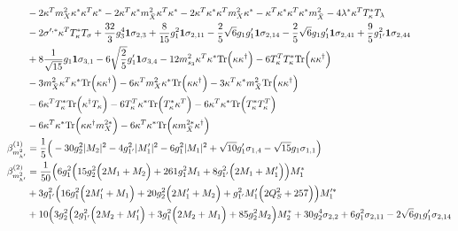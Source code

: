 {\begin{align}
 &-2 {\kappa^{T}  m_{X}^2  \kappa^*  \kappa^{T}  \kappa^*} -2 {\kappa^{T}  \kappa^*  m_{\bar{X}}^2  \kappa^{T}  \kappa^*} -2 {\kappa^{T}  \kappa^*  \kappa^{T}  m_{X}^2  \kappa^*} - {\kappa^{T}  \kappa^*  \kappa^{T}  \kappa^*  m_{\bar{X}}^2} -4 \lambda^* {\kappa^{T}  T_{\kappa}^*} T_{\lambda} \nonumber \\ 
 &-2 \sigma^{\prime,*} {\kappa^{T}  T_{\kappa}^*} T_{\sigma} +\frac{32}{3} g_{3}^{4} {\bf 1} \sigma_{2,3} +\frac{8}{15} g_{1}^{2} {\bf 1} \sigma_{2,11} -\frac{2}{5} \sqrt{6} g_1 g_1' {\bf 1} \sigma_{2,14} -\frac{2}{5} \sqrt{6} g_1 g_1' {\bf 1} \sigma_{2,41} +\frac{9}{5} g_{1'}^{2} {\bf 1} \sigma_{2,44} \nonumber \\ 
 &+8 \frac{1}{\sqrt{15}} g_1 {\bf 1} \sigma_{3,1} -6 \sqrt{\frac{2}{5}} g_1' {\bf 1} \sigma_{3,4} -12 m_{s_3}^2 {\kappa^{T}  \kappa^*} \mbox{Tr}\Big({\kappa  \kappa^{\dagger}}\Big) -6 {T_{\kappa}^{T}  T_{\kappa}^*} \mbox{Tr}\Big({\kappa  \kappa^{\dagger}}\Big) \nonumber \\ 
 &-3 {m_{\bar{X}}^2  \kappa^{T}  \kappa^*} \mbox{Tr}\Big({\kappa  \kappa^{\dagger}}\Big) -6 {\kappa^{T}  m_{X}^2  \kappa^*} \mbox{Tr}\Big({\kappa  \kappa^{\dagger}}\Big) -3 {\kappa^{T}  \kappa^*  m_{\bar{X}}^2} \mbox{Tr}\Big({\kappa  \kappa^{\dagger}}\Big) \nonumber \\ 
 &-6 {\kappa^{T}  T_{\kappa}^*} \mbox{Tr}\Big({\kappa^{\dagger}  T_{\kappa}}\Big) -6 {T_{\kappa}^{T}  \kappa^*} \mbox{Tr}\Big({T_{\kappa}^*  \kappa^{T}}\Big) -6 {\kappa^{T}  \kappa^*} \mbox{Tr}\Big({T_{\kappa}^*  T_{\kappa}^{T}}\Big) \nonumber \\ 
 &-6 {\kappa^{T}  \kappa^*} \mbox{Tr}\Big({\kappa  \kappa^{\dagger}  m_{X}^{2 *}}\Big) -6 {\kappa^{T}  \kappa^*} \mbox{Tr}\Big({\kappa  m_{\bar{X}}^{2 *}  \kappa^{\dagger}}\Big) \\ 
\beta_{m_{h'}^2}^{(1)} & =  
\frac{1}{5} \Big(-30 g_{2}^{2} |M_2|^2  -4 g_{1'}^{2} |M_1'|^2  -6 g_{1}^{2} |M_1|^2  + \sqrt{10} g_1' \sigma_{1,4}  - \sqrt{15} g_1 \sigma_{1,1} \Big)\\ 
\beta_{m_{h'}^2}^{(2)} & =  
\frac{1}{50} \Big(6 g_{1}^{2} \Big(15 g_{2}^{2} \Big(2 M_1  + M_2\Big) + 261 g_{1}^{2} M_1  + 8 g_{1'}^{2} \Big(2 M_1  + M_1'\Big)\Big)M_1^* \nonumber \\ 
 &+3 g_{1'}^{2} \Big(16 g_{1}^{2} \Big(2 M_1'  + M_1\Big) + 20 g_{2}^{2} \Big(2 M_1'  + M_2\Big) + g_{1'}^{2} M_1' \Big(2 Q_{S}^{2}  + 257\Big)\Big)M_1'^* \nonumber \\ 
 &+10 \Big(3 g_{2}^{2} \Big(2 g_{1'}^{2} \Big(2 M_2  + M_1'\Big) + 3 g_{1}^{2} \Big(2 M_2  + M_1\Big) + 85 g_{2}^{2} M_2 \Big)M_2^* +30 g_{2}^{4} \sigma_{2,2} +6 g_{1}^{2} \sigma_{2,11} -2 \sqrt{6} g_1 g_1' \sigma_{2,14} \nonumber \\ 

\end{align}}
